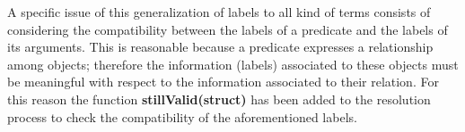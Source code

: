 A specific issue of this generalization of labels to all kind of terms consists of considering the compatibility between the labels of a predicate and
the labels of its arguments.\newline
This is reasonable because a predicate expresses a relationship among objects; therefore the information (labels) associated to these objects
must be meaningful with respect to the information associated to their relation.\newline
For this reason the function \textbf{stillValid(struct)} has been added to the resolution process to check the compatibility
of the aforementioned labels.

